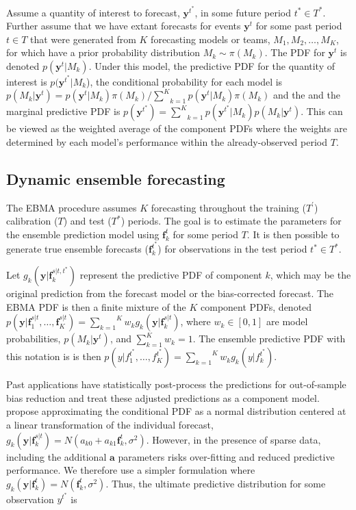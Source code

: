 \documentclass[12pt,fullpage,endnotes]{article}
\begin{document}
Assume a quantity of interest to forecast, $\mathbf{y}^{t^*}$, in some
future period $t^\ast \in T^\ast$.  Further assume that we have extant
forecasts for events $\mathbf{y}^t$ for some past period $t \in T$
that were generated from $K$ forecasting models or teams, $M_1, M_2,
\ldots, M_K$, for which have a prior probability distribution $M_k\sim
\pi(M_k)$. The PDF for $\mathbf{y}^t$ is denoted
$p(\mathbf{y}^t|M_k)$.  Under this model, the predictive PDF for the
quantity of interest is $p(\mathbf{y}^{t^*}|M_k$), the conditional
probability for each model is $p(M_k|\mathbf{y}^t) =
p(\mathbf{y}^t|M_k)\pi(M_k)/\underset{k=1}{\overset{K}{\sum}}p(\mathbf{y}^t|M_k)\pi(M_k)$
and the and the marginal predictive PDF is $p(\mathbf{y}^{t^*}) =
\underset{k=1}{\overset{K}{\sum}}
p(\mathbf{y}^{t^*}|M_k)p(M_k|\mathbf{y}^{t})$.  This can be viewed as
the weighted average of the component PDFs where the weights are
determined by each model's performance within the already-observed
period $T$.

\subsection{Dynamic ensemble forecasting}

The EBMA procedure assumes $K$ forecasting throughout the training
($T^{\prime}$) calibration ($T$) and test ($T^\ast$) periods.  The goal is
to estimate the parameters for the ensemble prediction model using
$\mathbf{f}^{t}_k$ for some period $T$.  It is then possible to
generate true ensemble forecasts ($\mathbf{f}_k^{t^\ast}$) for
observations in the test period $t^\ast \in T^*$.

Let $g_k(\mathbf{y}|\mathbf{f}_k^{s|t, t^\ast})$ represent the
predictive PDF of component $k$, which may be the original prediction
from the forecast model or the bias-corrected forecast.  The EBMA PDF
is then a finite mixture of the $K$ component PDFs, denoted
$p(\mathbf{y}|\mathbf{f}_1^{s|t}, \ldots,
\mathbf{f}_K^{s|t})=\overset{K}{\underset{k=1}{\sum}} w_k
g_k(\mathbf{y}|\mathbf{f}_k^{s|t})$, where $w_k \in [0,1]$ are model
probabilities, $p(M_k|\mathbf{y}^t)$, and $\sum_{k=1}^Kw_k=1$. The
ensemble predictive PDF with this notation is is then
$p(y|f_{1}^{t^\ast}, \ldots,
f_{K}^{t^\ast})=\overset{K}{\underset{k=1}{\sum}} w_k
g_k(y|f_{k}^{t^*})$.



Past applications have statistically post-process the predictions for
out-of-sample bias reduction and treat these adjusted predictions as a
component model. \citet{Raftery:2005} propose approximating the
conditional PDF as a normal distribution centered at a linear
transformation of the individual forecast,
$g_k(\mathbf{y}|\mathbf{f}_k^{s|t}) = N(a_{k0} +
a_{k1}\mathbf{f}_k^{t}, \sigma^2)$. However, in the presence of sparse
data, including the additional $\mathbf{a}$ parameters risks
over-fitting and reduced predictive performance.  We therefore use a
simpler formulation where $g_k(\mathbf{y}|\mathbf{f}_k^{t}) =
N(\mathbf{f}_k^{t}, \sigma^2)$.  Thus, the ultimate predictive
distribution for some observation $y^{t^\ast}$ is 
\end{document}
